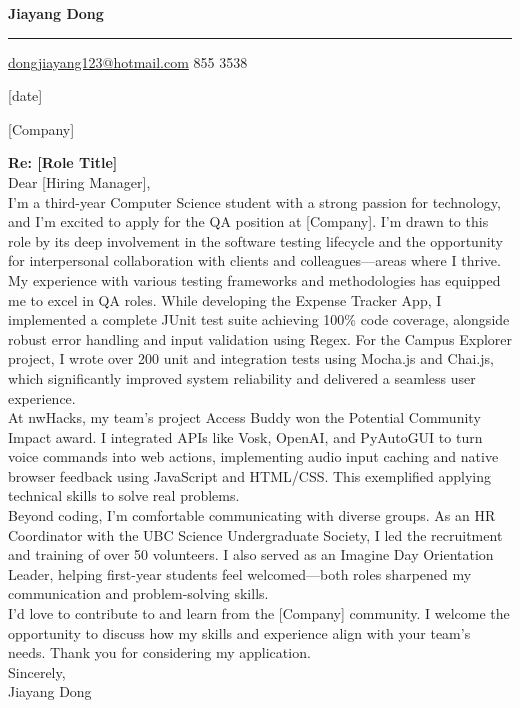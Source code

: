 \documentclass[letterpaper,12pt]{article}
\begin{document}
    \color{almost_black}
    
    {\fontsize{24pt}{28pt}\selectfont \textbf{Jiayang Dong} \par}
    \vspace{-1.5mm}
    \noindent\rule{\linewidth}{1.5pt}
    \vspace{3mm}
    \href{mailto:dongjiayang123@hotmail.com}{dongjiayang123@hotmail.com}  855 3538

    \vspace{3.5mm}
    [date] \newline
 
    [Company] \newline
    [Address] \newline
    
    \textbf{Re: [Role Title]} \\
    
    Dear [Hiring Manager], \\
     
    I’m a third-year Computer Science student with a strong passion for technology, and I’m excited to apply for the QA position at [Company]. I’m drawn to this role by its deep involvement in the software testing lifecycle and the opportunity for interpersonal collaboration with clients and colleagues—areas where I thrive. \\
    
    My experience with various testing frameworks and methodologies has equipped me to excel in QA roles. While developing the Expense Tracker App, I implemented a complete JUnit test suite achieving 100\% code coverage, alongside robust error handling and input validation using Regex. For the Campus Explorer project, I wrote over 200 unit and integration tests using Mocha.js and Chai.js, which significantly improved system reliability and delivered a seamless user experience. \\
    
    At nwHacks, my team’s project Access Buddy won the Potential Community Impact award. I integrated APIs like Vosk, OpenAI, and PyAutoGUI to turn voice commands into web actions, implementing audio input caching and native browser feedback using JavaScript and HTML/CSS. This exemplified applying technical skills to solve real problems. \\
    
    Beyond coding, I’m comfortable communicating with diverse groups. As an HR Coordinator with the UBC Science Undergraduate Society, I led the recruitment and training of over 50 volunteers. I also served as an Imagine Day Orientation Leader, helping first-year students feel welcomed—both roles sharpened my communication and problem-solving skills. \\
    
    I'd love to contribute to and learn from the [Company] community. I welcome the opportunity to discuss how my skills and experience align with your team's needs. Thank you for considering my application. \\
    
    Sincerely, \\
    Jiayang Dong 
\end{document}
